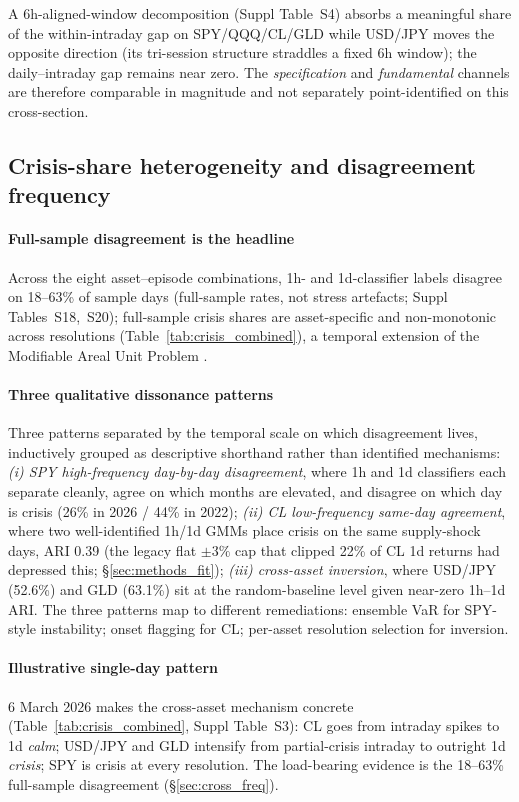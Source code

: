 \documentclass[preprint,12pt,authoryear]{elsarticle}
\begin{document}
A 6h-aligned-window decomposition (Suppl Table~S4) absorbs a meaningful share of the within-intraday gap on SPY/QQQ/CL/GLD while USD/JPY moves the opposite direction (its tri-session structure straddles a fixed 6h window); the daily--intraday gap remains near zero. The \emph{specification} and \emph{fundamental} channels are therefore comparable in magnitude and not separately point-identified on this cross-section.

\subsection{Crisis-share heterogeneity and disagreement frequency}
\label{sec:inversion}

\paragraph{Full-sample disagreement is the headline} Across the eight asset--episode combinations, 1h- and 1d-classifier labels disagree on 18--63\% of sample days (full-sample rates, not stress artefacts; Suppl Tables~S18,~S20); full-sample crisis shares are asset-specific and non-monotonic across resolutions (Table~\ref{tab:crisis_combined}), a temporal extension of the Modifiable Areal Unit Problem \citep{Openshaw1984MAUP,ChengAdepeju2014MTUP}.

\paragraph{Three qualitative dissonance patterns} Three patterns separated by the temporal scale on which disagreement lives, inductively grouped as descriptive shorthand rather than identified mechanisms: \emph{(i) SPY high-frequency day-by-day disagreement}, where 1h and 1d classifiers each separate cleanly, agree on which months are elevated, and disagree on which day is crisis (26\% in 2026 / 44\% in 2022); \emph{(ii) CL low-frequency same-day agreement}, where two well-identified 1h/1d GMMs place crisis on the same supply-shock days, ARI 0.39 (the legacy flat $\pm 3\%$ cap that clipped 22\% of CL 1d returns had depressed this; \S\ref{sec:methods_fit}); \emph{(iii) cross-asset inversion}, where USD/JPY (52.6\%) and GLD (63.1\%) sit at the random-baseline level given near-zero 1h--1d ARI. The three patterns map to different remediations: ensemble VaR for SPY-style instability; onset flagging for CL; per-asset resolution selection for inversion.

\paragraph{Illustrative single-day pattern}
6 March 2026 makes the cross-asset mechanism concrete (Table~\ref{tab:crisis_combined}, Suppl Table~S3): CL goes from intraday spikes to 1d \textit{calm}; USD/JPY and GLD intensify from partial-crisis intraday to outright 1d \textit{crisis}; SPY is crisis at every resolution. The load-bearing evidence is the 18--63\% full-sample disagreement (\S\ref{sec:cross_freq}).
\end{document}
